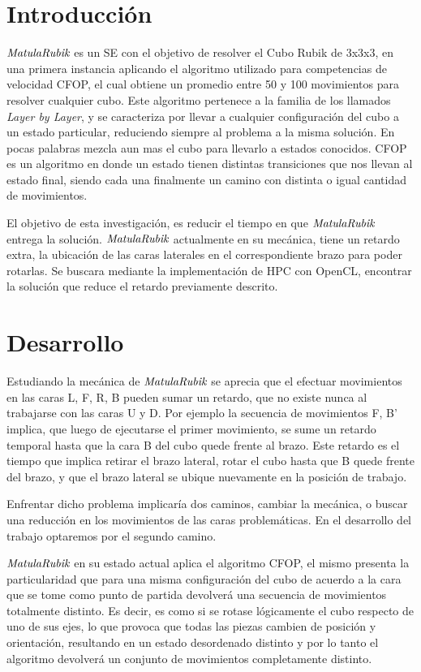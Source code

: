 \documentclass[runningheads,a4paper]{llncs}
\newcommand{\MR}{$\emph{MatulaRubik}$ }
\begin{document}
\section{Introducción}
\MR es un SE con el objetivo de resolver el Cubo Rubik de 3x3x3, en una primera instancia aplicando el algoritmo utilizado para competencias de velocidad CFOP, el cual obtiene un promedio entre 50 y 100 movimientos para resolver cualquier cubo.
Este algoritmo pertenece a la familia de los llamados \emph{Layer by Layer}, y se caracteriza por llevar a cualquier configuración del cubo a un estado particular, reduciendo siempre 
al problema a la misma solución. En pocas palabras mezcla aun mas el cubo para llevarlo a estados conocidos. 
CFOP es un algoritmo en donde un estado tienen distintas transiciones que nos llevan al estado final, siendo 
cada una finalmente un camino con distinta o igual cantidad de movimientos. 


El objetivo de esta investigación, es reducir el tiempo en que \MR  entrega la solución. \MR  actualmente en su mecánica, 
tiene un retardo extra, la ubicación de las caras laterales en el correspondiente brazo para poder rotarlas. Se buscara mediante
la implementación de HPC con OpenCL, encontrar la solución que reduce el retardo previamente descrito.

\section{Desarrollo}

Estudiando la mecánica de \MR se aprecia que el efectuar movimientos en las caras L, F, R, B pueden sumar un retardo, que no existe nunca al trabajarse con las caras U y D. Por ejemplo la secuencia de movimientos F, B' implica, que luego de ejecutarse el primer movimiento, se sume un retardo temporal hasta que la cara B del cubo quede frente al brazo. Este retardo es el tiempo que implica retirar el brazo lateral, rotar el cubo hasta que B quede frente del brazo, y que el brazo lateral se ubique nuevamente en la posición de trabajo.

Enfrentar dicho problema implicaría dos caminos,  cambiar la mecánica, o buscar una reducción en los movimientos de las caras problemáticas. En el desarrollo del trabajo optaremos por el segundo camino.

\MR en su estado actual aplica el algoritmo CFOP, el mismo presenta la particularidad que para una misma configuración del cubo de acuerdo a la cara que se tome como punto de partida devolverá una secuencia de movimientos totalmente distinto. Es decir, es como si se rotase lógicamente el cubo respecto de uno de sus ejes, lo que provoca que todas las piezas cambien de posición y orientación, resultando en un estado desordenado distinto y por lo tanto el algoritmo devolverá un conjunto de movimientos completamente distinto.
\end{document}
